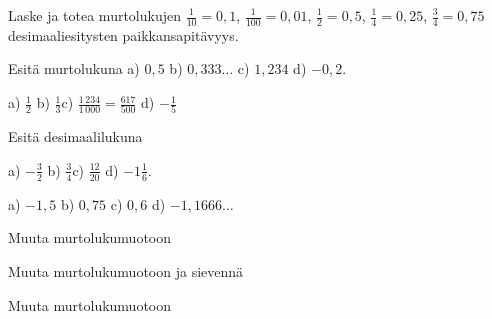 \begin{tehtavasivu}

\begin{tehtava}
Laske ja totea murtolukujen 
 $ \frac{1}{10} = 0,1$, 
$ \frac{1}{100} = 0,01$, 
 $ \frac{1}{2} = 0,5$, 
$ \frac{1}{4} = 0,25$, 
$ \frac{3}{4} = 0,75$
desimaaliesitysten paikkansapitävyys.
\end{tehtava}

\begin{tehtava}
Esitä murtolukuna
a) $0,5$ \qquad b) $0,333\ldots$ \qquad c) $1,234$ \qquad d) $-0,2$.
\begin{vastaus}
a) $\frac{1}{2}$ \qquad b) $\frac{1}{3}$\qquad c) $\frac{1\,234}{1\,000}=\frac{617}{500}$ d) $-\frac{1}{5}$
\end{vastaus}
\end{tehtava}

\begin{tehtava}
Esitä desimaalilukuna

a) $-\frac{3}{2}$ \qquad b) $\frac{3}{4}$\qquad c) $\frac{12}{20}$ d) $-1\frac{1}{6}$.
\begin{vastaus}
a) $-1,5$ \qquad b) $0,75$ \qquad c) $0,6$ \qquad d) $-1,1666\ldots$
\end{vastaus}
\end{tehtava}

\begin{tehtava}
Muuta murtolukumuotoon
\begin{vastaus}
\end{vastaus}
\end{tehtava}

\begin{tehtava}
Muuta murtolukumuotoon ja sievennä
\begin{vastaus}
\end{vastaus}
\end{tehtava}

\begin{tehtava}
Muuta murtolukumuotoon
\begin{vastaus}
\end{vastaus}
\end{tehtava}


\end{tehtavasivu}
